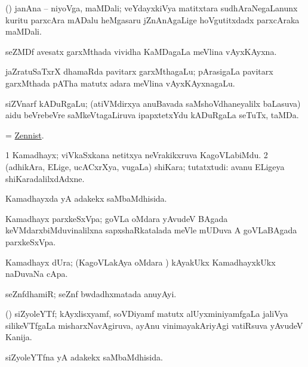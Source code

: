 \noindent
\gl{\pagu} 
\bmng
{}  (\ca) janAna -- niyoVga, maMDali; veYdayxkiVya matitxtara sudhAraNegaLanunx kuritu parxcAra mADalu heMgasaru jZnAnAgaLige hoVgutitxdadx parxcAraka maMDali.
\emng
\eentry

\bentry
{} 
\gl{\nA} 
\bmng
seZMDf avesatx garxMthada vividha KaMDagaLa meVlina vAyxKAyxna.
\emng
\eentry

\bentry
{} 
\gl{\nA}
\bmng
jaZratuSaTxrX  dhamaRda pavitarx  garxMthagaLu; pArasigaLa pavitarx garxMthada pATha matutx adara meVlina vAyxKAyxnagaLu.
\emng
\eentry

\bentry
{}  
\gl{\nA}
\bmng
siZVnarf kADuRgaLu; (atiVMdirxya anuBavada saMshoVdhaneyalilx baLasuva) aidu beVrebeVre saMkeVtagaLiruva  ipapxtetxYdu  kADuRgaLa  seTuTx, taMDa.
\emng
\eentry

\bentry
{} 
\gl{\nA}
\bmng
= \hyperlink{Zennist}{Zennist}.
\emng
\eentry

\bentry
{} 
\gl{\nA} 
\bmng
\bnum
\num{1} Kamadhayx; viVkaSxkana netitxya neVrakikxruva KagoVLabiMdu. 
\num{2} (adhikAra, ELige, ucACxrXya, \mo vugaLa) shiKara; tutatxtudi:  avanu ELigeya shiKaradalilxdAdxne.
\enum
\emng
\eentry

\bentry
{} 
\gl{\gu} 
\bmng
Kamadhayxda yA adakekx saMbaMdhisida.
\emng
\eentry

\bentry
{}  
\gl{\nA} 
\bmng
Kamadhayx parxkeSxVpa; goVLa oMdara yAvudeV BAgada keVMdarxbiMduvinalilxna sapxshaRkatalada meVle mUDuva A goVLaBAgada parxkeSxVpa.
\emng
\eentry

\bentry
{}  
\gl{\nA} 
\bmng
Kamadhayx dUra; (KagoVLakAya oMdara \vi) kAyakUkx KamadhayxkUkx naDuvaNa cApa.
\emng
\eentry

\bentry
{} 
\gl{\nA} 
\bmng
seZnfdhamiR;  seZnf bwdadhxmatada anuyAyi.
\emng
\eentry

\bentry
{} 
\gl{\nA} 
\bmng
(\BUvi) siZyoleYTf; kAyxlisxyamf, soVDiyamf matutx alUyxminiyamfgaLa jaliVya silikeVTfgaLa misharxNavAgiruva, ayAnu vinimayakAriyAgi vatiRsuva yAvudeV Kanija.
\emng
\eentry

\bentry
{} 
\gl{\gu} 
\bmng
siZyoleYTfna yA adakekx saMbaMdhisida.
\emng
\eentry

